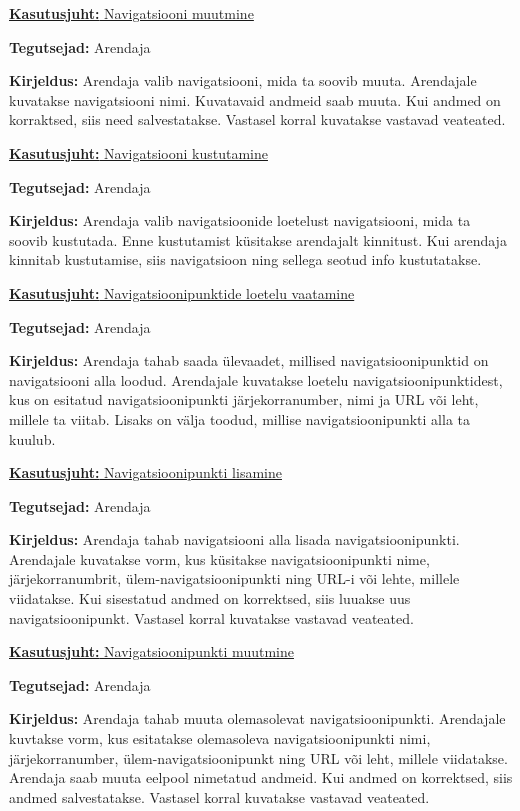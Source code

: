 \documentclass[a4paper,12pt]{article} %
\begin{document}
\underline{\textbf{Kasutusjuht:} Navigatsiooni muutmine}
\par
\textbf{Tegutsejad:} Arendaja
\par
\textbf{Kirjeldus:} Arendaja valib navigatsiooni, mida ta soovib muuta. Arendajale kuvatakse navigatsiooni nimi. Kuvatavaid andmeid saab muuta. Kui andmed on korraktsed, siis need salvestatakse. Vastasel korral kuvatakse vastavad veateated.
\par

\underline{\textbf{Kasutusjuht:} Navigatsiooni kustutamine}
\par
\textbf{Tegutsejad:} Arendaja
\par
\textbf{Kirjeldus:} Arendaja valib navigatsioonide loetelust navigatsiooni, mida ta soovib kustutada. Enne kustutamist küsitakse arendajalt kinnitust. Kui arendaja kinnitab kustutamise, siis navigatsioon ning sellega seotud info kustutatakse.
\par

\underline{\textbf{Kasutusjuht:} Navigatsioonipunktide loetelu vaatamine}
\par
\textbf{Tegutsejad:} Arendaja
\par
\textbf{Kirjeldus:} Arendaja tahab saada ülevaadet, millised navigatsioonipunktid on navigatsiooni alla loodud. Arendajale kuvatakse loetelu navigatsioonipunktidest, kus on esitatud navigatsioonipunkti järjekorranumber, nimi ja URL või leht, millele ta viitab. Lisaks on välja toodud, millise navigatsioonipunkti alla ta kuulub.
\par

\underline{\textbf{Kasutusjuht:} Navigatsioonipunkti lisamine}
\par
\textbf{Tegutsejad:} Arendaja
\par
\textbf{Kirjeldus:} Arendaja tahab navigatsiooni alla lisada navigatsioonipunkti. Arendajale kuvatakse vorm, kus küsitakse navigatsioonipunkti nime, järjekorranumbrit, ülem-navigatsioonipunkti ning URL-i või lehte, millele viidatakse. Kui sisestatud andmed on korrektsed, siis luuakse uus navigatsioonipunkt. Vastasel korral kuvatakse vastavad veateated.
\par

\underline{\textbf{Kasutusjuht:} Navigatsioonipunkti muutmine}
\par
\textbf{Tegutsejad:} Arendaja
\par
\textbf{Kirjeldus:} Arendaja tahab muuta olemasolevat navigatsioonipunkti. Arendajale kuvtakse vorm, kus esitatakse olemasoleva navigatsioonipunkti nimi, järjekorranumber, ülem-navigatsioonipunkt ning URL või leht, millele viidatakse. Arendaja saab muuta eelpool nimetatud andmeid. Kui andmed on korrektsed, siis andmed salvestatakse. Vastasel korral kuvatakse vastavad veateated.
\par
\end{document}

